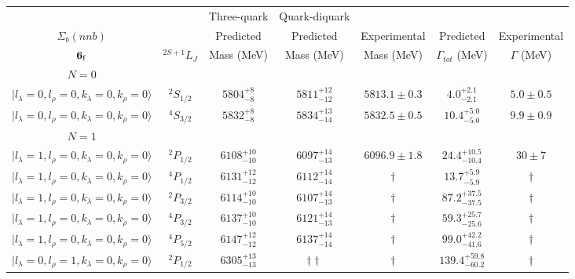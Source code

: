 \begin{tabular}{c c| c c c c c }\hline \hline
            &  & Three-quark &  Quark-diquark    &               &              &  \\ 
$\Sigma_{b}(nnb)$&  & Predicted   &    Predicted   &  Experimental &  Predicted            & Experimental \\ 
${\bf {6}}_{\rm f}$  & $^{2S+1}L_{J}$ & Mass (MeV)  &   Mass (MeV)   &  Mass (MeV)   &  $\Gamma_{tot}$ (MeV) & $\Gamma$ (MeV) \\ \hline
\hline
 $N=0$  &  &  &  &  &  \\ 
$\vert l_{\lambda}\!\!=\!0, l_{\rho}\!\!=\!0, k_{\lambda}\!\!=\!0, k_{\rho}\!\!=\!0 \rangle$ & $^{2}S_{1/2}$ & $5804^{+8}_{-8}$ & $5811^{+12}_{-12}$ & $5813.1\pm 0.3$ & $4.0^{+2.1}_{-2.1}$ & $5.0\pm 0.5$ \\ 
$\vert l_{\lambda}\!\!=\!0, l_{\rho}\!\!=\!0, k_{\lambda}\!\!=\!0, k_{\rho}\!\!=\!0 \rangle$ & $^{4}S_{3/2}$ & $5832^{+8}_{-8}$ & $5834^{+13}_{-14}$ & $5832.5\pm 0.5$ & $10.4^{+5.0}_{-5.0}$ & $9.9\pm 0.9$ \\ 
\hline
 $N=1$  &  &  &  &  &  \\ 
$\vert l_{\lambda}\!\!=\!1, l_{\rho}\!\!=\!0, k_{\lambda}\!\!=\!0, k_{\rho}\!\!=\!0 \rangle$ & $^{2}P_{1/2}$ & $6108^{+10}_{-10}$ & $6097^{+14}_{-13}$ & $6096.9\pm 1.8$ & $24.4^{+10.5}_{-10.4}$ & $30\pm 7$ \\ 
$\vert l_{\lambda}\!\!=\!1, l_{\rho}\!\!=\!0, k_{\lambda}\!\!=\!0, k_{\rho}\!\!=\!0 \rangle$ & $^{4}P_{1/2}$ & $6131^{+12}_{-12}$ & $6112^{+14}_{-14}$ & $\dagger$ & $13.7^{+5.9}_{-5.9}$ & $\dagger$ \\ 
$\vert l_{\lambda}\!\!=\!1, l_{\rho}\!\!=\!0, k_{\lambda}\!\!=\!0, k_{\rho}\!\!=\!0 \rangle$ & $^{2}P_{3/2}$ & $6114^{+10}_{-10}$ & $6107^{+14}_{-13}$ & $\dagger$ & $87.2^{+37.5}_{-37.5}$ & $\dagger$ \\ 
$\vert l_{\lambda}\!\!=\!1, l_{\rho}\!\!=\!0, k_{\lambda}\!\!=\!0, k_{\rho}\!\!=\!0 \rangle$ & $^{4}P_{3/2}$ & $6137^{+10}_{-10}$ & $6121^{+14}_{-13}$ & $\dagger$ & $59.3^{+25.7}_{-25.6}$ & $\dagger$ \\ 
$\vert l_{\lambda}\!\!=\!1, l_{\rho}\!\!=\!0, k_{\lambda}\!\!=\!0, k_{\rho}\!\!=\!0 \rangle$ & $^{4}P_{5/2}$ & $6147^{+12}_{-12}$ & $6137^{+14}_{-14}$ & $\dagger$ & $99.0^{+42.2}_{-41.6}$ & $\dagger$ \\ 
$\vert l_{\lambda}\!\!=\!0, l_{\rho}\!\!=\!1, k_{\lambda}\!\!=\!0, k_{\rho}\!\!=\!0 \rangle$ & $^{2}P_{1/2}$ & $6305^{+13}_{-13}$ & $\dagger\dagger$ & $\dagger$ & $139.4^{+59.8}_{-60.2}$ & $\dagger$ \\ 

\end{tabular}
